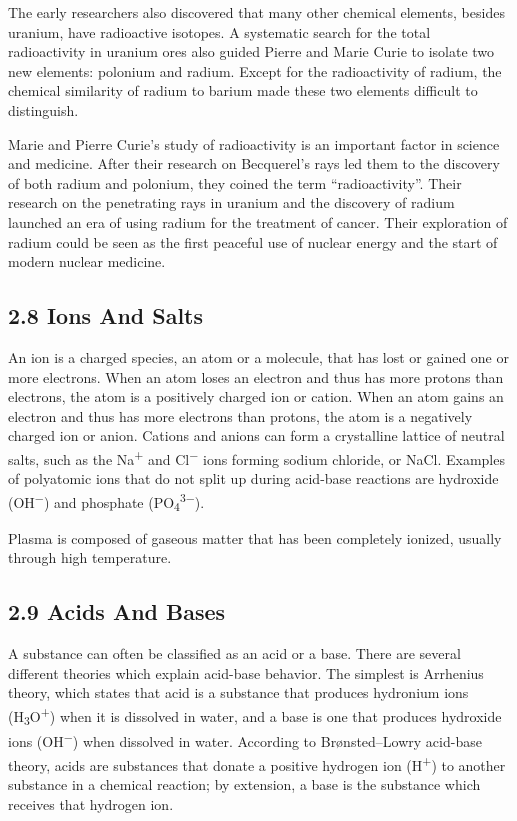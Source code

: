 \documentclass[
]{article}
\theoremstyle{definition}
\theoremstyle{definition}
\theoremstyle{definition}
\theoremstyle{remark}
\begin{document}
The early researchers also discovered that many other chemical elements,
besides uranium, have radioactive isotopes. A systematic search for the
total radioactivity in uranium ores also guided Pierre and Marie Curie
to isolate two new elements: polonium and radium. Except for the
radioactivity of radium, the chemical similarity of radium to barium
made these two elements difficult to distinguish.

Marie and Pierre Curie's study of radioactivity is an important factor
in science and medicine. After their research on Becquerel's rays led
them to the discovery of both radium and polonium, they coined the term
``radioactivity''. Their research on the penetrating rays in uranium and
the discovery of radium launched an era of using radium for the
treatment of cancer. Their exploration of radium could be seen as the
first peaceful use of nuclear energy and the start of modern nuclear
medicine.

\hypertarget{ions-and-salts}{%
\subsection{\texorpdfstring{{2.8} Ions And
Salts}{2.8 Ions And Salts}}\label{ions-and-salts}}

An ion is a charged species, an atom or a molecule, that has lost or
gained one or more electrons. When an atom loses an electron and thus
has more protons than electrons, the atom is a positively charged ion or
cation. When an atom gains an electron and thus has more electrons than
protons, the atom is a negatively charged ion or anion. Cations and
anions can form a crystalline lattice of neutral salts, such as the
Na\textsuperscript{+} and Cl\textsuperscript{−} ions forming sodium
chloride, or NaCl. Examples of polyatomic ions that do not split up
during acid-base reactions are hydroxide (OH\textsuperscript{−}) and
phosphate (PO\textsubscript{4}\textsuperscript{3−}).

Plasma is composed of gaseous matter that has been completely ionized,
usually through high temperature.

\hypertarget{acids-and-bases}{%
\subsection{\texorpdfstring{{2.9} Acids And
Bases}{2.9 Acids And Bases}}\label{acids-and-bases}}

A substance can often be classified as an acid or a base. There are
several different theories which explain acid-base behavior. The
simplest is Arrhenius theory, which states that acid is a substance that
produces hydronium ions (H\textsubscript{3}O\textsuperscript{+}) when it
is dissolved in water, and a base is one that produces hydroxide ions
(OH\textsuperscript{−}) when dissolved in water. According to
Brønsted--Lowry acid-base theory, acids are substances that donate a
positive hydrogen ion (H\textsuperscript{+}) to another substance in a
chemical reaction; by extension, a base is the substance which receives
that hydrogen ion.
\end{document}
